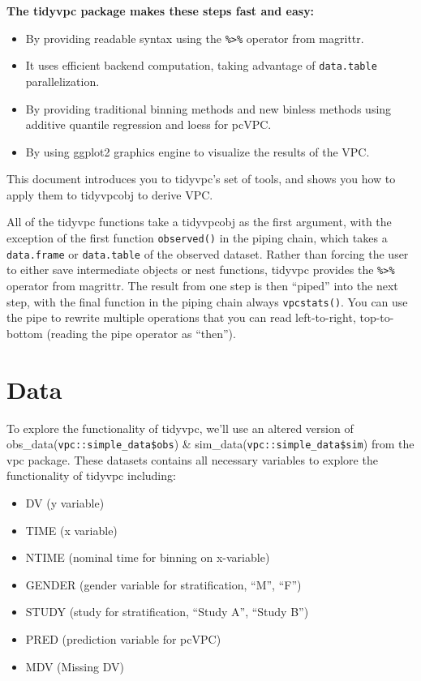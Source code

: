 \documentclass[
]{book}
\begin{document}
\textbf{The tidyvpc package makes these steps fast and easy:}

\begin{itemize}
\item
  By providing readable syntax using the \texttt{\%\textgreater{}\%} operator from magrittr.
\item
  It uses efficient backend computation, taking advantage of \texttt{data.table} parallelization.
\item
  By providing traditional binning methods and new binless methods using additive quantile regression and loess for pcVPC.
\item
  By using ggplot2 graphics engine to visualize the results of the VPC.
\end{itemize}

This document introduces you to tidyvpc's set of tools, and shows you how to apply them to tidyvpcobj to derive VPC.

All of the tidyvpc functions take a tidyvpcobj as the first argument, with the exception of the first function \texttt{observed()} in the piping chain, which takes a \texttt{data.frame} or \texttt{data.table} of the observed dataset. Rather than forcing the user to either save intermediate objects or nest functions, tidyvpc provides the \texttt{\%\textgreater{}\%} operator from magrittr. The result from one step is then ``piped'' into the next step, with the final function in the piping chain always \texttt{vpcstats()}. You can use the pipe to rewrite multiple operations that you can read left-to-right, top-to-bottom (reading the pipe operator as ``then'').

\hypertarget{data}{%
\section{Data}\label{data}}

To explore the functionality of tidyvpc, we'll use an altered version of obs\_data(\texttt{vpc::simple\_data\$obs}) \& sim\_data(\texttt{vpc::simple\_data\$sim}) from the vpc package. These datasets contains all necessary variables to explore the functionality of tidyvpc including:

\begin{itemize}
\item
  DV (y variable)
\item
  TIME (x variable)
\item
  NTIME (nominal time for binning on x-variable)
\item
  GENDER (gender variable for stratification, ``M'', ``F'')
\item
  STUDY (study for stratification, ``Study A'', ``Study B'')
\item
  PRED (prediction variable for pcVPC)
\item
  MDV (Missing DV)
\end{itemize}
\end{document}
